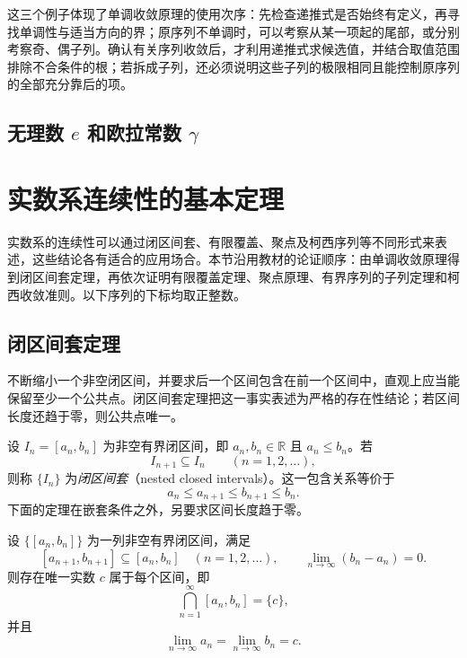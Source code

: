 这三个例子体现了单调收敛原理的使用次序：先检查递推式是否始终有定义，再寻找单调性与适当方向的界；原序列不单调时，可以考察从某一项起的尾部，或分别考察奇、偶子列。确认有关序列收敛后，才利用递推式求候选值，并结合取值范围排除不合条件的根；若拆成子列，还必须说明这些子列的极限相同且能控制原序列的全部充分靠后的项。

\subsection{无理数 \texorpdfstring{$e$}{e} 和欧拉常数 \texorpdfstring{$\gamma$}{gamma}}
\label{subsec:e-and-euler-constant}

\section{实数系连续性的基本定理}
\label{sec:fundamental-theorems-of-real-continuity}

实数系的连续性可以通过闭区间套、有限覆盖、聚点及柯西序列等不同形式来表述，这些结论各有适合的应用场合。本节沿用教材的论证顺序：由单调收敛原理得到闭区间套定理，再依次证明有限覆盖定理、聚点原理、有界序列的子列定理和柯西收敛准则。以下序列的下标均取正整数。

\subsection{闭区间套定理}
\label{subsec:nested-interval-theorem}

不断缩小一个非空闭区间，并要求后一个区间包含在前一个区间中，直观上应当能保留至少一个公共点。闭区间套定理把这一事实表述为严格的存在性结论；若区间长度还趋于零，则公共点唯一。

\begin{definition}
\label{def:nested-closed-intervals}
设 $I_n=[a_n,b_n]$ 为非空有界闭区间，即 $a_n,b_n\in\mathbb{R}$ 且 $a_n\leq b_n$。若
\[
    I_{n+1}\subseteq I_n\qquad(n=1,2,\ldots),
\]
则称 $\{I_n\}$ 为\emph{闭区间套}（nested closed intervals）。这一包含关系等价于
\[
    a_n\leq a_{n+1}\leq b_{n+1}\leq b_n.
\]
下面的定理在嵌套条件之外，另要求区间长度趋于零。
\end{definition}

\begin{theorem}[闭区间套定理]
\label{thm:nested-closed-intervals}
设 $\{[a_n,b_n]\}$ 为一列非空有界闭区间，满足
\[
    [a_{n+1},b_{n+1}]\subseteq[a_n,b_n]\quad(n=1,2,\ldots),
    \qquad
    \lim_{n\to\infty}(b_n-a_n)=0.
\]
则存在唯一实数 $c$ 属于每个区间，即
\[
    \bigcap_{n=1}^{\infty}[a_n,b_n]=\{c\},
\]
并且
\[
    \lim_{n\to\infty}a_n=\lim_{n\to\infty}b_n=c.
\]
\end{theorem}

